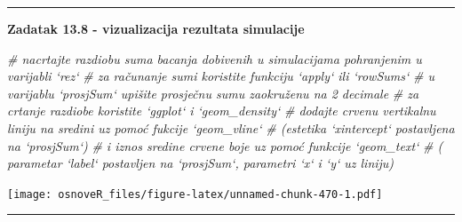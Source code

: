 \documentclass[]{book}
\newenvironment{Shaded}{\begin{snugshade}}{\end{snugshade}}
\newcommand{\KeywordTok}[1]{\textcolor[rgb]{0.13,0.29,0.53}{\textbf{#1}}}
\newcommand{\DataTypeTok}[1]{\textcolor[rgb]{0.13,0.29,0.53}{#1}}
\newcommand{\DecValTok}[1]{\textcolor[rgb]{0.00,0.00,0.81}{#1}}
\newcommand{\FloatTok}[1]{\textcolor[rgb]{0.00,0.00,0.81}{#1}}
\newcommand{\StringTok}[1]{\textcolor[rgb]{0.31,0.60,0.02}{#1}}
\newcommand{\CommentTok}[1]{\textcolor[rgb]{0.56,0.35,0.01}{\textit{#1}}}
\newcommand{\OperatorTok}[1]{\textcolor[rgb]{0.81,0.36,0.00}{\textbf{#1}}}
\newcommand{\NormalTok}[1]{#1}
\theoremstyle{definition}
\theoremstyle{definition}
\theoremstyle{definition}
\theoremstyle{remark}
\begin{document}
\begin{center}\rule{0.5\linewidth}{\linethickness}\end{center}

\textbf{Zadatak 13.8 - vizualizacija rezultata simulacije}

\begin{Shaded}
\begin{Highlighting}[]
\CommentTok{# nacrtajte razdiobu suma bacanja dobivenih u simulacijama pohranjenim u varijabli `rez`}
\CommentTok{# za računanje sumi koristite funkciju `apply` ili `rowSums`}
\CommentTok{# u varijablu `prosjSum` upišite prosječnu sumu zaokruženu na 2 decimale}
\CommentTok{# za crtanje razdiobe koristite `ggplot` i `geom_density`}
\CommentTok{# dodajte crvenu vertikalnu liniju na sredini uz pomoć fukcije `geom_vline`}
\CommentTok{#    (estetika `xintercept` postavljena na `prosjSum`)}
\CommentTok{# i iznos sredine crvene boje uz pomoć funkcije `geom_text` }
\CommentTok{#    ( parametar `label` postavljen na `prosjSum`, parametri `x` i `y` uz liniju)}
\end{Highlighting}
\end{Shaded}

\begin{Shaded}
\end{Shaded}

\texttt{[image: osnoveR\_files/figure-latex/unnamed-chunk-470-1.pdf]}

\begin{center}\rule{0.5\linewidth}{\linethickness}\end{center}
\end{document}
